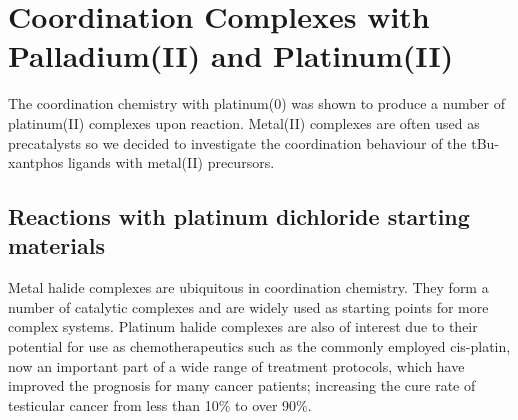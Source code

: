 
\chapter{Coordination Complexes with Palladium(II) and Platinum(II)}
\label{ch:platinumII}







The coordination chemistry with platinum(0) was shown to produce a number of platinum(II) complexes upon reaction.  Metal(II) complexes are often used as precatalysts so we decided to investigate the coordination behaviour of the tBu-xantphos ligands with metal(II) precursors.  


\section{Reactions with platinum dichloride starting materials}

Metal halide complexes are ubiquitous in coordination chemistry.  They form a number of catalytic complexes and are widely used as starting points for more complex systems.  Platinum halide complexes are also of interest due to their potential for use as chemotherapeutics such as the commonly employed cis-platin, now an important part of a wide range of treatment protocols, which have improved the prognosis for many cancer patients; increasing the cure rate of testicular cancer from less than 10\%{} to over 90\%.\cite{Wilson2013}

